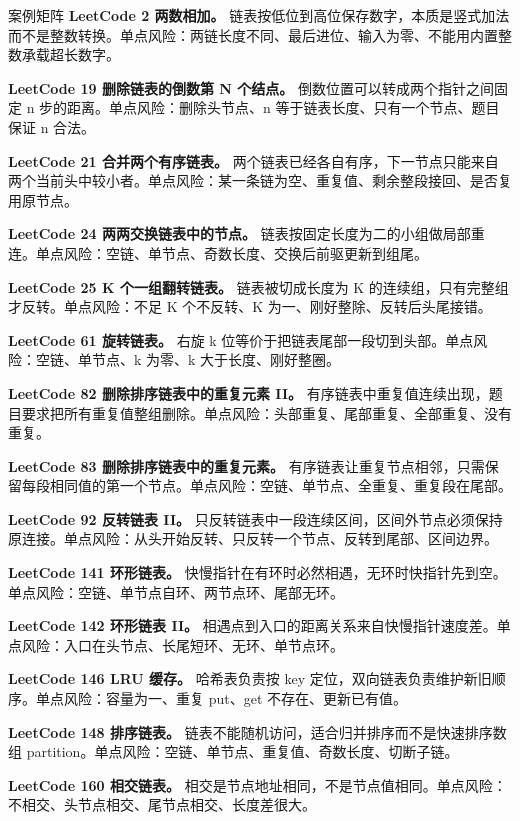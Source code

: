 \begin{principlebox}{案例矩阵}
\textbf{LeetCode 2 两数相加。}
链表按低位到高位保存数字，本质是竖式加法而不是整数转换。单点风险：两链长度不同、最后进位、输入为零、不能用内置整数承载超长数字。

\textbf{LeetCode 19 删除链表的倒数第 N 个结点。}
倒数位置可以转成两个指针之间固定 n 步的距离。单点风险：删除头节点、n 等于链表长度、只有一个节点、题目保证 n 合法。

\textbf{LeetCode 21 合并两个有序链表。}
两个链表已经各自有序，下一节点只能来自两个当前头中较小者。单点风险：某一条链为空、重复值、剩余整段接回、是否复用原节点。

\textbf{LeetCode 24 两两交换链表中的节点。}
链表按固定长度为二的小组做局部重连。单点风险：空链、单节点、奇数长度、交换后前驱更新到组尾。

\textbf{LeetCode 25 K 个一组翻转链表。}
链表被切成长度为 K 的连续组，只有完整组才反转。单点风险：不足 K 个不反转、K 为一、刚好整除、反转后头尾接错。

\textbf{LeetCode 61 旋转链表。}
右旋 k 位等价于把链表尾部一段切到头部。单点风险：空链、单节点、k 为零、k 大于长度、刚好整圈。

\textbf{LeetCode 82 删除排序链表中的重复元素 II。}
有序链表中重复值连续出现，题目要求把所有重复值整组删除。单点风险：头部重复、尾部重复、全部重复、没有重复。

\textbf{LeetCode 83 删除排序链表中的重复元素。}
有序链表让重复节点相邻，只需保留每段相同值的第一个节点。单点风险：空链、单节点、全重复、重复段在尾部。

\textbf{LeetCode 92 反转链表 II。}
只反转链表中一段连续区间，区间外节点必须保持原连接。单点风险：从头开始反转、只反转一个节点、反转到尾部、区间边界。

\textbf{LeetCode 141 环形链表。}
快慢指针在有环时必然相遇，无环时快指针先到空。单点风险：空链、单节点自环、两节点环、尾部无环。

\textbf{LeetCode 142 环形链表 II。}
相遇点到入口的距离关系来自快慢指针速度差。单点风险：入口在头节点、长尾短环、无环、单节点环。

\textbf{LeetCode 146 LRU 缓存。}
哈希表负责按 key 定位，双向链表负责维护新旧顺序。单点风险：容量为一、重复 put、get 不存在、更新已有值。

\textbf{LeetCode 148 排序链表。}
链表不能随机访问，适合归并排序而不是快速排序数组 partition。单点风险：空链、单节点、重复值、奇数长度、切断子链。

\textbf{LeetCode 160 相交链表。}
相交是节点地址相同，不是节点值相同。单点风险：不相交、头节点相交、尾节点相交、长度差很大。


\end{principlebox}
